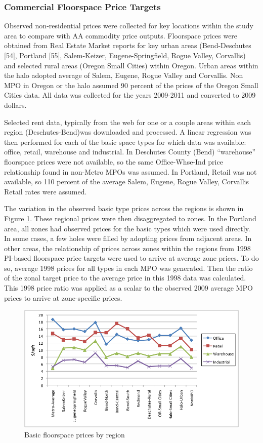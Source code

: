 \subsubsection{Commercial Floorspace Price Targets}
Observed non-residential prices were collected for key locations within the study area to compare with AA commodity price outputs. Floorspace prices were obtained from Real Estate Market reports for key urban areas (Bend-Deschutes [54], Portland [55], Salem-Keizer, Eugene-Springfield, Rogue Valley, Corvallis) and selected rural areas (Oregon Small Cities) within Oregon. Urban areas within the halo adopted average of Salem, Eugene, Rogue Valley and Corvallis. Non MPO in Oregon or the halo assumed 90 percent of the prices of the Oregon Small Cities data. All data was collected for the years 2009-2011 and converted to 2009 dollars.

Selected rent data, typically from the web for one or a couple areas within each region (Deschutes-Bend)was downloaded and processed. A linear regression was then performed for each of the basic space types for which data was available: office, retail, warehouse and industrial. In Deschutes County (Bend) ``warehouse'' floorspace prices were not available, so the same Office-Whse-Ind price relationship found in non-Metro MPOs was assumed. In Portland, Retail was not available, so 110 percent of the average Salem, Eugene, Rogue Valley, Corvallis Retail rates were assumed.

The variation in the observed basic type prices across the regions is shown in Figure \ref{fig:aa-basic-floorspace-prices}. These regional prices were then disaggregated to zones. In the Portland area, all zones had observed prices for the basic types which were used directly. In some cases, a few holes were filled by adopting prices from adjacent areas. In other areas, the relationship of prices across zones within the regions from 1998 PI-based floorspace price targets were used to arrive at average zone prices. To do so, average 1998 prices for all types in each MPO was generated. Then the ratio of the zonal target price to the average price in this 1998 data was calculated. This 1998 price ratio was applied as a scalar to the observed 2009 average MPO prices to arrive at zone-specific prices. 

\begin{figure}    %
\centering
\includegraphics[width=6.0in]{aa/basic-floorspace-prices}
\caption{Basic floorspace prices by region}
\label{fig:aa-basic-floorspace-prices}
\end{figure}

